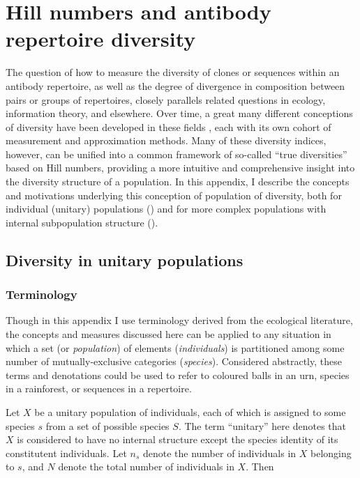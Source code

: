 \chapter{Hill numbers and antibody repertoire diversity}
\label{app:diversity}

\normalsize

The question of how to measure the diversity of clones or sequences within an antibody repertoire, as well as the degree of divergence in composition between pairs or groups of repertoires, closely parallels related questions in ecology, information theory, and elsewhere. Over time, a great many different conceptions of diversity have been developed in these fields \citep{peet1974diversity}, each with its own cohort of measurement and approximation methods. Many of these diversity indices, however, can be unified into a common framework of so-called ``true diversities'' based on Hill numbers, providing a more intuitive and comprehensive insight into the diversity structure of a population. In this appendix, I describe the concepts and motivations underlying this conception of population of diversity, both for individual (unitary) populations () and for more complex populations with internal subpopulation structure ().

\section{Diversity in unitary populations}
\label{app:diversity-unitary}

\subsection{Terminology}
\label{app:diversity-unitary-terminology}

Though in this appendix I use terminology derived from the ecological literature, the concepts and measures discussed here can be applied to any situation in which a set (or \textit{population}) of elements (\textit{individuals}) is partitioned among some number of mutually-exclusive categories (\textit{species}). Considered abstractly, these terms and denotations could be used to refer to coloured balls in an urn, species in a rainforest, or sequences in a repertoire.

Let $X$ be a unitary population of individuals, each of which is assigned to some species $s$ from a set of possible species $S$. The term ``unitary'' here denotes that $X$ is considered to have no internal structure except the species identity of its constitutent individuals. Let $n_s$ denote the number of individuals in $X$ belonging to $s$, and $N$ denote the total number of individuals in $X$. Then 

